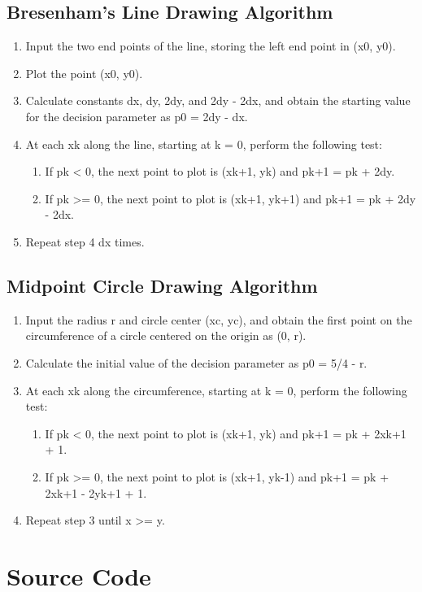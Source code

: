 \documentclass[12pt]{article}
\begin{document}
	\subsection{Bresenham's Line Drawing Algorithm}
	\begin{enumerate}
		\item Input the two end points of the line, storing the left end point in (x0, y0).
		\item Plot the point (x0, y0).
		\item Calculate constants dx, dy, 2dy, and 2dy - 2dx, and obtain the starting value for the decision parameter as p0 = 2dy - dx.
		\item At each xk along the line, starting at k = 0, perform the following test:
		\begin{enumerate}
			\item If pk < 0, the next point to plot is (xk+1, yk) and pk+1 = pk + 2dy.
			\item If pk >= 0, the next point to plot is (xk+1, yk+1) and pk+1 = pk + 2dy - 2dx.
		\end{enumerate}
		\item Repeat step 4 dx times.
	\end{enumerate}
	\subsection{Midpoint Circle Drawing Algorithm}
	\begin{enumerate}
		\item Input the radius r and circle center (xc, yc), and obtain the first point on the circumference of a circle centered on the origin as (0, r).
		\item Calculate the initial value of the decision parameter as p0 = 5/4 - r.
		\item At each xk along the circumference, starting at k = 0, perform the following test:
		\begin{enumerate}
			\item If pk < 0, the next point to plot is (xk+1, yk) and pk+1 = pk + 2xk+1 + 1.
			\item If pk >= 0, the next point to plot is (xk+1, yk-1) and pk+1 = pk + 2xk+1 - 2yk+1 + 1.
		\end{enumerate}
		\item Repeat step 3 until x >= y.
	\end{enumerate}
	\section{Source Code}
\end{document}
